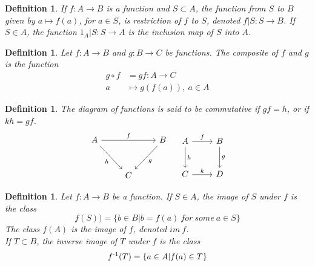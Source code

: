 \documentclass[a4paper,8pt]{article}
\theoremstyle{theorem}
\newtheorem{definition}[theorem]{Definition}
\begin{document}
\begin{definition}
If $ f: A \rightarrow B $ is a function and $ S \subset A$, the function from $ S $ to $ B $ given by $ a \mapsto f(a) $, for $ a \in S $, is \textit{{\color{blue} restriction}} of $ f $ to $ S $, denoted $ f|S: S \rightarrow B$.\newline
If $ S \in A$, the function $ 1_A | S: S \rightarrow A $ is the \textit{{\color{blue} inclusion map}} of $S$ into $A$.\\
\end{definition}


\begin{definition}
Let $ f: A \rightarrow B $ and $ g: B \rightarrow C $ be functions. The \textit{{\color{blue} composite}} of $ f $ and $ g $ is the function
\begin{align}
g \circ f & = gf: A \rightarrow C \nonumber \\
a & \mapsto g(f(a)),\ a \in A \nonumber
\end{align}
\end{definition}


\begin{definition}
The \textit{{\color{blue} diagram of functions}} is said to be commutative if $ gf = h $, or if $ kh = gf $.\\

\begin{equation}
\label{diagram}
\begin{tikzcd}
A \arrow{rr}{f} \arrow[swap]{dr}{h} & & B \arrow{dl}{g} \\[10pt]
    & C
\end{tikzcd}
\quad
\begin{tikzcd}[row sep=2.5em]
 A \ar{r}{f} \ar{d}{h} & B \ar{d}{g} \\
 C \ar{r}{k} & D
\end{tikzcd}
\nonumber
\end{equation}
\end{definition}


\begin{definition}
Let $ f: A \rightarrow B $ be a function. If $ S \in A $, \textit{{\color{blue} the image of $ S $ under $ f $}} is the class
\begin{equation}
f(S)) = \{ b \in B | b=f(a) \ for \ some \ a \in S\} \nonumber
\end{equation}
The class $ f(A) $ is the \textit{{\color{blue} image of $ f $}}, denoted $ im \ f $.\\
If $ T \subset B $, the \textit{{\color{blue} inverse image of $ T $}} under $ f $ is the class 
\begin{equation}
f \textsuperscript{-1} (T) = \{ a \in A | f(a) \in T\} \nonumber
\end{equation}
\end{definition}
\end{document}
